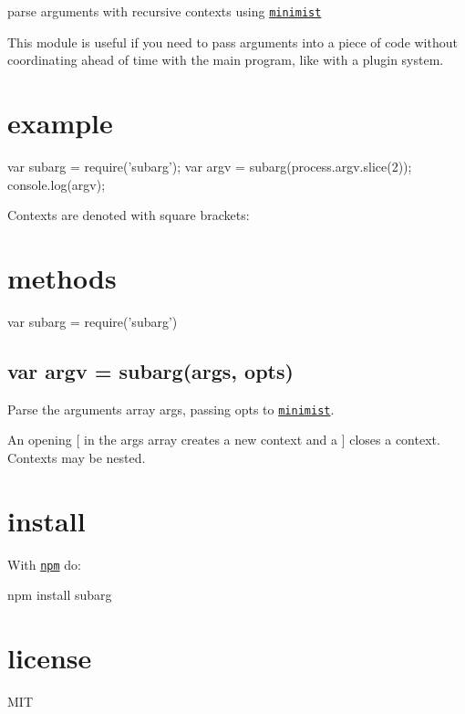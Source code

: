 parse arguments with recursive contexts using \href{https://npmjs.org/package/minimist}{\tt minimist}

\href{https://ci.testling.com/substack/subarg}{\tt }

\href{http://travis-ci.org/substack/subarg}{\tt }

This module is useful if you need to pass arguments into a piece of code without coordinating ahead of time with the main program, like with a plugin system.

\section*{example}


\begin{DoxyCode}
var subarg = require('subarg');
var argv = subarg(process.argv.slice(2));
console.log(argv);
\end{DoxyCode}


Contexts are denoted with square brackets\+:




\section*{methods}


\begin{DoxyCode}
var subarg = require('subarg')
\end{DoxyCode}


\subsection*{var argv = subarg(args, opts)}

Parse the arguments array {\ttfamily args}, passing {\ttfamily opts} to \href{https://npmjs.org/package/minimist}{\tt minimist}.

An opening {\ttfamily \mbox{[}} in the {\ttfamily args} array creates a new context and a {\ttfamily \mbox{]}} closes a context. Contexts may be nested.

\section*{install}

With \href{https://npmjs.org}{\tt npm} do\+:


\begin{DoxyCode}
npm install subarg
\end{DoxyCode}


\section*{license}

M\+IT 